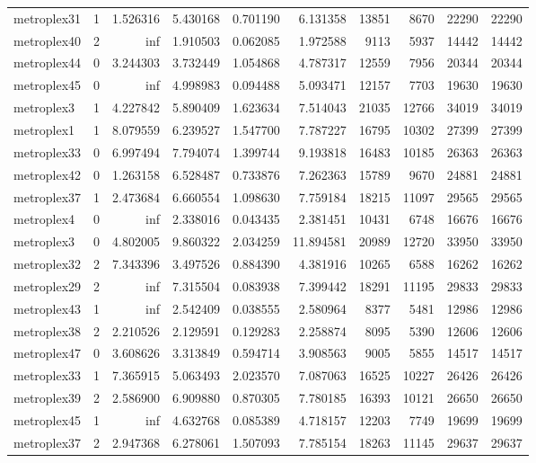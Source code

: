 \begin{longtable}{|l|r|r|r|r|r|r|r|r|r|}
metroplex31 & 1 & 1.526316 & 5.430168 & 0.701190 & 6.131358 & 13851 & 8670 & 22290 & 22290 \\
metroplex40 & 2 & inf & 1.910503 & 0.062085 & 1.972588 & 9113 & 5937 & 14442 & 14442 \\
metroplex44 & 0 & 3.244303 & 3.732449 & 1.054868 & 4.787317 & 12559 & 7956 & 20344 & 20344 \\
metroplex45 & 0 & inf & 4.998983 & 0.094488 & 5.093471 & 12157 & 7703 & 19630 & 19630 \\
metroplex3 & 1 & 4.227842 & 5.890409 & 1.623634 & 7.514043 & 21035 & 12766 & 34019 & 34019 \\
metroplex1 & 1 & 8.079559 & 6.239527 & 1.547700 & 7.787227 & 16795 & 10302 & 27399 & 27399 \\
metroplex33 & 0 & 6.997494 & 7.794074 & 1.399744 & 9.193818 & 16483 & 10185 & 26363 & 26363 \\
metroplex42 & 0 & 1.263158 & 6.528487 & 0.733876 & 7.262363 & 15789 & 9670 & 24881 & 24881 \\
metroplex37 & 1 & 2.473684 & 6.660554 & 1.098630 & 7.759184 & 18215 & 11097 & 29565 & 29565 \\
metroplex4 & 0 & inf & 2.338016 & 0.043435 & 2.381451 & 10431 & 6748 & 16676 & 16676 \\
metroplex3 & 0 & 4.802005 & 9.860322 & 2.034259 & 11.894581 & 20989 & 12720 & 33950 & 33950 \\
metroplex32 & 2 & 7.343396 & 3.497526 & 0.884390 & 4.381916 & 10265 & 6588 & 16262 & 16262 \\
metroplex29 & 2 & inf & 7.315504 & 0.083938 & 7.399442 & 18291 & 11195 & 29833 & 29833 \\
metroplex43 & 1 & inf & 2.542409 & 0.038555 & 2.580964 & 8377 & 5481 & 12986 & 12986 \\
metroplex38 & 2 & 2.210526 & 2.129591 & 0.129283 & 2.258874 & 8095 & 5390 & 12606 & 12606 \\
metroplex47 & 0 & 3.608626 & 3.313849 & 0.594714 & 3.908563 & 9005 & 5855 & 14517 & 14517 \\
metroplex33 & 1 & 7.365915 & 5.063493 & 2.023570 & 7.087063 & 16525 & 10227 & 26426 & 26426 \\
metroplex39 & 2 & 2.586900 & 6.909880 & 0.870305 & 7.780185 & 16393 & 10121 & 26650 & 26650 \\
metroplex45 & 1 & inf & 4.632768 & 0.085389 & 4.718157 & 12203 & 7749 & 19699 & 19699 \\
metroplex37 & 2 & 2.947368 & 6.278061 & 1.507093 & 7.785154 & 18263 & 11145 & 29637 & 29637 \\

\end{longtable}
